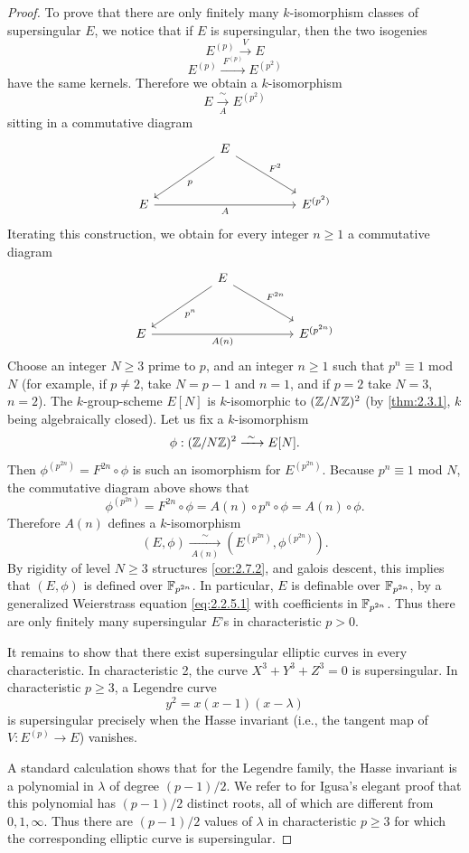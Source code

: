 \begin{proof}
To prove that there are only finitely many $k$-isomorphism classes of supersingular $E$, we notice that if $E$ is supersingular, then the two isogenies
\[
E^{(p)} \xrightarrow{\ V\ } E
\]
\[
E^{(p)} \xrightarrow{\ F^{(p)}\ } E^{(p^2)}
\]
have the same kernels. Therefore we obtain a $k$-isomorphism
\[
E \xrightarrow[\ A\ ]{\ \sim\ } E^{(p^2)}
\]
sitting in a commutative diagram
\[
\begin{tikzcd}[row sep=large, column sep=huge]
  & E \arrow[dl, "p"] \arrow[dr, "F^2"] & \\
  E \arrow[rr, "A"'] & & E^{(p^2)}
\end{tikzcd}
\]
Iterating this construction, we obtain for every integer $n \ge 1$ a commutative diagram
\[
\begin{tikzcd}[row sep=large, column sep=huge]
  & E \arrow[dl, "p^n"] \arrow[dr, "F^{2n}"] & \\
  E \arrow[rr, "A(n)"'] & & E^{(p^{2n})}
\end{tikzcd}
\]
Choose an integer $N \ge 3$ prime to $p$, and an integer $n \ge 1$ such that $p^n \equiv 1$ mod $N$ (for example, if $p \ne 2$, take $N = p - 1$ and $n = 1$, and if $p = 2$ take $N = 3$, $n = 2$). The $k$-group-scheme $E[N]$ is $k$-isomorphic to $(\mathbb{Z}/N\mathbb{Z})^2$ (by \eqref{thm:2.3.1}, $k$ being algebraically closed). Let us fix a $k$-isomorphism
\[
\phi : (\mathbb{Z}/N\mathbb{Z})^2 \xrightarrow{\ \sim\ } E[N].
\]
Then $\phi^{(p^{2n})} = F^{2n} \circ \phi$ is such an isomorphism for $E^{(p^{2n})}$. Because $p^n \equiv 1$ mod $N$, the commutative diagram above shows that
\[
\phi^{(p^{2n})} = F^{2n} \circ \phi = A(n) \circ p^n \circ \phi = A(n) \circ \phi.
\]
Therefore $A(n)$ defines a $k$-isomorphism
\[
(E, \phi) \xrightarrow[\ A(n)\ ]{\ \sim\ } (E^{(p^{2n})}, \phi^{(p^{2n})}).
\]
By rigidity of level $N \ge 3$ structures \eqref{cor:2.7.2}, and galois descent, this implies that $(E, \phi)$ is defined over $\mathbb{F}_{p^{2n}}$. In particular, $E$ is definable over $\mathbb{F}_{p^{2n}}$, by a generalized Weierstrass equation \eqref{eq:2.2.5.1} with coefficients in $\mathbb{F}_{p^{2n}}$. Thus there are only finitely many supersingular $E$'s in characteristic $p > 0$.

It remains to show that there exist supersingular elliptic curves in every characteristic. In characteristic 2, the curve $X^3 + Y^3 + Z^3 = 0$ is supersingular. In characteristic $p \ge 3$, a Legendre curve
\[
y^2 = x(x-1)(x-\lambda)
\]
is supersingular precisely when the Hasse invariant (i.e., the tangent map of $V : E^{(p)} \to E$) vanishes.

A standard calculation \cite[p.~216]{Mum4} shows that for the Legendre family, the Hasse invariant is a polynomial in $\lambda$ of degree $(p-1)/2$. We refer to \cite{Ig1} for Igusa's elegant proof that this polynomial has $(p-1)/2$ distinct roots, all of which are different from $0, 1, \infty$. Thus there are $(p-1)/2$ values of $\lambda$ in characteristic $p \ge 3$ for which the corresponding elliptic curve is supersingular.
\end{proof}

